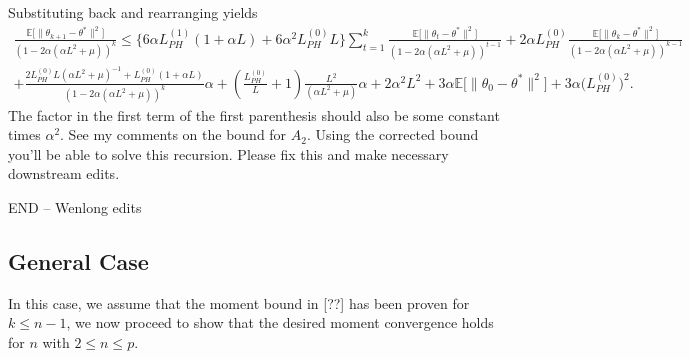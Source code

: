 \documentclass[a4paper]{article}
\newcommand{\norm}[1]{\|#1 \|}
\newcommand{\Exs}{\mathbb{E}}
\newcommand{\thetastar}{\theta^*}
\newcommand{\constLPH}[1]{L_{PH}^{(#1)}}
\newcommand{\mwlcomment}[1]{{\color{orange} #1}}
\newcommand{\stepsize}{\alpha}
\begin{document}
Substituting back and rearranging yields
\begin{multline*}
	\frac{\Exs \big[ \norm{\theta_{k + 1} - \thetastar}^2 \big]}{(1 - 2 \stepsize (\stepsize L^2 + \mu))^k} \leq  \Big\{ 6 \stepsize \constLPH{1} (1 + \stepsize L) +  6 \stepsize^2 \constLPH{0} L  \Big\} \sum_{t = 1}^k \frac{\Exs \big[ \norm{\theta_{t} - \thetastar}^2 \big]}{(1 - 2 \stepsize (\stepsize L^2 + \mu))^{t - 1}} + 2 \stepsize \constLPH{0} \frac{\Exs \big[ \norm{\theta_k - \thetastar}^2 \big]}{(1 - 2 \stepsize (\stepsize L^2 + \mu))^{k - 1}} \\
	 +\frac{2 \constLPH{0} L (\alpha L^{2} + \mu)^{-1} + \constLPH{0} (1 + \stepsize L) }{(1 - 2 \stepsize (\stepsize L^2 + \mu))^k} \stepsize +  \left(\frac{L_{PH}^{(0)}}{L} + 1\right)\frac{L^{2}}{\left(\alpha L^{2} + \mu\right)} \stepsize + 2 \stepsize^2 L^2 + 3 \stepsize \Exs \big[ \norm{\theta_0 - \thetastar}^2 \big] + 3\stepsize \big(\constLPH{0} \big)^2.
\end{multline*}
\mwlcomment{The factor in the first term of the first parenthesis should also be some constant times $\stepsize^2$. See my comments on the bound for $A_2$. Using the corrected bound you'll be able to solve this recursion. Please fix this and make necessary downstream edits.}







\mwlcomment{END -- Wenlong edits}


\subsection{General Case}
In this case, we assume that the moment bound in [??] has been proven for $k \le n - 1$, we now proceed to show that the desired moment convergence holds for $n$ with $2 \le n \le p$.
\end{document}
